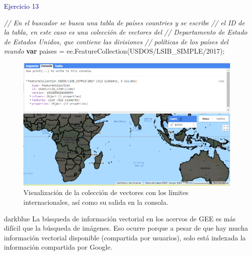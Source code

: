\documentclass[
  12pt,
  letterpaper,
  twoside]{book}
\newenvironment{Shaded}{\begin{snugshade}}{\end{snugshade}}
\newcommand{\CommentTok}[1]{\textcolor[rgb]{0.24,0.58,0.00}{\textit{#1}}}
\newcommand{\FunctionTok}[1]{\textcolor[rgb]{0.48,0.12,0.64}{#1}}
\newcommand{\KeywordTok}[1]{\textcolor[rgb]{0.00,0.00,0.00}{\textbf{#1}}}
\newcommand{\NormalTok}[1]{#1}
\newcommand{\OperatorTok}[1]{\textcolor[rgb]{0.00,0.00,0.00}{#1}}
\newcommand{\StringTok}[1]{\textcolor[rgb]{0.87,0.29,0.22}{#1}}
\begin{document}
\textcolor{darkblue}{Ejercicio 13}

\begin{Shaded}
\begin{Highlighting}[]
\CommentTok{// En el buscador se busca una tabla de países \textquotesingle{}countries\textquotesingle{} y se escribe }
\CommentTok{// el ID de la tabla, en este caso es una colección de vectores del }
\CommentTok{// Departamento de Estado de Estados Unidos, que contiene las divisiones }
\CommentTok{// políticas de los países del mundo  }
\KeywordTok{var}\NormalTok{ paises }\OperatorTok{=}\NormalTok{ ee}\OperatorTok{.}\FunctionTok{FeatureCollection}\NormalTok{(}\StringTok{\textquotesingle{}USDOS/LSIB\_SIMPLE/2017\textquotesingle{}}\NormalTok{)}\OperatorTok{;}
\end{Highlighting}
\end{Shaded}

\begin{figure}[H]

{\centering \includegraphics[width=0.95\linewidth]{Img/ej13} 

}

\caption{Visualización de la colección de vectores con los límites internacionales, así como su salida en la consola.}\label{fig:f81}
\end{figure}

\begin{bluebox2}

\begin{awesomeblock}{5pt}{\faLightbulb}{darkblue}
La búsqueda de información vectorial en los acervos de GEE es más difícil que la búsqueda de imágenes. Eso ocurre porque a pesar de que hay mucha información vectorial disponible (compartida por usuarios), solo está indexada la información compartida por Google.

\end{awesomeblock}

\end{bluebox2}
\end{document}
